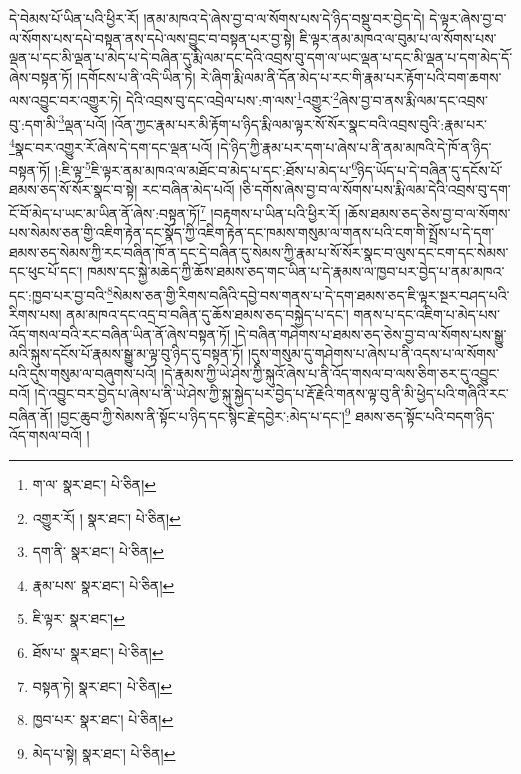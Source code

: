 དེ་བེམས་པོ་ཡིན་པའི་ཕྱིར་རོ། །ནམ་མཁའ་དེ་ཞེས་བྱ་བ་ལ་སོགས་པས་དེ་ཉིད་བསྡུ་བར་བྱེད་དེ། དེ་ལྟར་ཞེས་བྱ་བ་ལ་སོགས་པས་དཔེ་བསྟན་ནས་དཔེ་ལས་བྱུང་བ་བསྟན་པར་བྱ་སྟེ། ཇི་ལྟར་ནམ་མཁའ་ལ་བུམ་པ་ལ་སོགས་པས་ལྡན་པ་དང་མི་ལྡན་པ་མེད་པ་དེ་བཞིན་དུ་རྨི་ལམ་དང་དེའི་འབྲས་བུ་དག་ལ་ཡང་ལྡན་པ་དང་མི་ལྡན་པ་དག་མེད་དོ་ཞེས་བསྟན་ཏོ། །དགོངས་པ་ནི་འདི་ཡིན་ཏེ། རེ་ཞིག་རྨི་ལམ་ནི་དོན་མེད་པ་རང་གི་རྣམ་པར་རྟོག་པའི་བག་ཆགས་ལས་འབྱུང་བར་འགྱུར་ཏེ། དེའི་འབྲས་བུ་དང་འབྲེལ་པས་:ག་ལས་\footnote{ག་ལ་  སྣར་ཐང་།  པེ་ཅིན། }འགྱུར་\footnote{འགྱུར་རོ། །  སྣར་ཐང་།  པེ་ཅིན། }ཞེས་བྱ་བ་ནས་རྨི་ལམ་དང་འབྲས་བུ་:དག་མི་\footnote{དག་ནི་  སྣར་ཐང་།  པེ་ཅིན། }ལྡན་པའོ། །འོན་ཀྱང་རྣམ་པར་མི་རྟོག་པ་ཉིད་རྨི་ལམ་ལྟར་སོ་སོར་སྣང་བའི་འབྲས་བུའི་:རྣམ་པར་\footnote{རྣམ་པས་  སྣར་ཐང་།  པེ་ཅིན། }སྣང་བར་འགྱུར་རོ་ཞེས་དེ་དག་དང་ལྡན་པའོ། །དེ་ཉིད་ཀྱི་རྣམ་པར་དག་པ་ཞེས་པ་ནི་ནམ་མཁའི་དེ་ཁོ་ན་ཉིད་བསྟན་ཏོ། །:ཇི་ལྟ་\footnote{ཇི་ལྟར་  སྣར་ཐང་། }ཇི་ལྟར་ནམ་མཁའ་ལ་མཐོང་བ་མེད་པ་དང་:ཐོས་པ་མེད་པ་\footnote{ཐོས་པ་  སྣར་ཐང་།  པེ་ཅིན། }ཉིད་ཡོད་པ་དེ་བཞིན་དུ་དངོས་པོ་ཐམས་ཅད་སོ་སོར་སྣང་བ་སྟེ། རང་བཞིན་མེད་པའོ། །ཅི་དགོས་ཞེས་བྱ་བ་ལ་སོགས་པས་རྨི་ལམ་དེའི་འབྲས་བུ་དག་ངོ་བོ་མེད་པ་ཡང་མ་ཡིན་ནོ་ཞེས་:བསྟན་ཏོ།\footnote{བསྟན་ཏེ།  སྣར་ཐང་།  པེ་ཅིན། } །བརྟགས་པ་ཡིན་པའི་ཕྱིར་རོ། །ཆོས་ཐམས་ཅད་ཅེས་བྱ་བ་ལ་སོགས་པས་སེམས་ཅན་གྱི་འཇིག་རྟེན་དང་སྣོད་ཀྱི་འཇིག་རྟེན་དང་ཁམས་གསུམ་ལ་གནས་པའི་ངག་གི་སྤྲོས་པ་དེ་དག་ཐམས་ཅད་སེམས་ཀྱི་རང་བཞིན་ཁོ་ན་དང་དེ་བཞིན་དུ་སེམས་ཀྱི་རྣམ་པ་སོ་སོར་སྣང་བ་ལུས་དང་ངག་དང་སེམས་དང་ཕུང་པོ་དང་། ཁམས་དང་སྐྱེ་མཆེད་ཀྱི་ཆོས་ཐམས་ཅད་གང་ཡིན་པ་དེ་རྣམས་ལ་ཁྱབ་པར་བྱེད་པ་ནམ་མཁའ་དང་:ཁྱབ་པར་བྱ་བའི་\footnote{ཁྱབ་པར་  སྣར་ཐང་།  པེ་ཅིན། }སེམས་ཅན་གྱི་རིགས་བཞིའི་དབྱེ་བས་གནས་པ་དེ་དག་ཐམས་ཅད་ཇི་ལྟར་སྔར་བཤད་པའི་རིགས་པས། ནམ་མཁའ་དང་འདྲ་བ་བཞིན་དུ་ཆོས་ཐམས་ཅད་བསྐྱེད་པ་དང་། གནས་པ་དང་འཇིག་པ་མེད་པས་འོད་གསལ་བའི་རང་བཞིན་ཡིན་ནོ་ཞེས་བསྟན་ཏོ། །དེ་བཞིན་གཤེགས་པ་ཐམས་ཅད་ཅེས་བྱ་བ་ལ་སོགས་པས་སྒྱུ་མའི་སྐུས་དངོས་པོ་རྣམས་སྒྱུ་མ་ལྟ་བུ་ཉིད་དུ་བསྟན་ཏོ། །དུས་གསུམ་དུ་གཤེགས་པ་ཞེས་པ་ནི་འདས་པ་ལ་སོགས་པའི་དུས་གསུམ་ལ་བཞུགས་པའོ། །དེ་རྣམས་ཀྱི་ཡེ་ཤེས་ཀྱི་སྐུའོ་ཞེས་པ་ནི་འོད་གསལ་བ་ལས་ཅིག་ཅར་དུ་འབྱུང་བའོ། །དེ་འབྱུང་བར་བྱེད་པ་ཞེས་པ་ནི་ཡེ་ཤེས་ཀྱི་སྐུ་སྐྱེད་པར་བྱེད་པ་རྡོ་རྗེའི་གནས་ལྟ་བུ་ནི་མི་ཕྱེད་པའི་གཞིའི་རང་བཞིན་ནོ། །བྱང་ཆུབ་ཀྱི་སེམས་ནི་སྟོང་པ་ཉིད་དང་སྙིང་རྗེ་དབྱེར་:མེད་པ་དང་།\footnote{མེད་པ་སྟེ།  སྣར་ཐང་།  པེ་ཅིན། } ཐམས་ཅད་སྟོང་པའི་བདག་ཉིད་འོད་གསལ་བའོ། །
